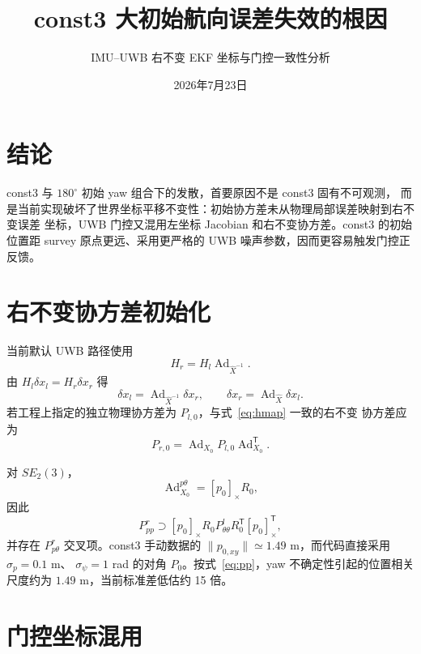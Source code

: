 \documentclass[10pt,a4paper]{ctexart}
\title{const3 大初始航向误差失效的根因}
\author{IMU--UWB 右不变 EKF 坐标与门控一致性分析}
\date{2026年7月23日}
\begin{document}
\maketitle

\section{结论}

const3 与 $180^\circ$ 初始 yaw 组合下的发散，首要原因不是 const3 固有不可观测，
而是当前实现破坏了世界坐标平移不变性：初始协方差未从物理局部误差映射到右不变误差
坐标，UWB 门控又混用左坐标 Jacobian 和右不变协方差。const3 的初始位置距 survey
原点更远、采用更严格的 UWB 噪声参数，因而更容易触发门控正反馈。

\section{右不变协方差初始化}

当前默认 UWB 路径使用
\begin{equation}
H_r=H_l\operatorname{Ad}_{\hat X^{-1}}.
\label{eq:hmap}
\end{equation}
由 $H_l\delta x_l=H_r\delta x_r$ 得
\begin{equation}
\delta x_l=\operatorname{Ad}_{\hat X^{-1}}\delta x_r,\qquad
\delta x_r=\operatorname{Ad}_{\hat X}\delta x_l.
\end{equation}
若工程上指定的独立物理协方差为 $P_{l,0}$，与式~\eqref{eq:hmap} 一致的右不变
协方差应为
\begin{equation}
P_{r,0}=\operatorname{Ad}_{X_0}P_{l,0}
\operatorname{Ad}_{X_0}^{\mathsf T}.
\label{eq:pmap}
\end{equation}

对 $SE_2(3)$，
\begin{equation}
\operatorname{Ad}_{X_0}^{p\theta}=[p_0]_\times R_0,
\end{equation}
因此
\begin{equation}
P_{pp}^{r}\supset[p_0]_\times R_0P_{\theta\theta}^{l}
R_0^\mathsf T[p_0]_\times^\mathsf T,
\label{eq:pp}
\end{equation}
并存在 $P_{p\theta}^{r}$ 交叉项。const3 手动数据的
$\|p_{0,xy}\|\simeq1.49$ m，而代码直接采用 $\sigma_p=0.1$ m、
$\sigma_\psi=1$ rad 的对角 $P_0$。按式~\eqref{eq:pp}，yaw 不确定性引起的位置相关
尺度约为 $1.49$ m，当前标准差低估约 15 倍。

\section{门控坐标混用}
\end{document}
